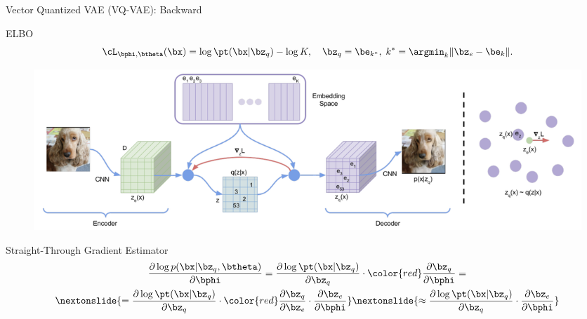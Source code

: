\documentclass{beamer}
\begin{document}
\begin{frame}{Vector Quantized VAE (VQ-VAE): Backward}
	\begin{block}{ELBO}
		\vspace{-0.5cm}
		\[
			\cL_{\bphi, \btheta}(\bx)  =  \log \pt(\bx| \bz_q) - \log K, \quad \bz_q = \be_{k^*},\; k^* = \argmin_k \| \bz_e - \be_k \|.
		\]
		\vspace{-0.5cm}
	\end{block}
    \eqpause
	\begin{figure}
		\centering
		\includegraphics[width=0.85\linewidth]{figs/vqvae}
	\end{figure}
    \eqpause
	\vspace{-0.3cm}
	\begin{block}{Straight-Through Gradient Estimator}
		\vspace{-0.5cm}
		\begin{multline*}
		\frac{\partial \log p(\bx | \bz_q , \btheta)}{\partial \bphi} = \frac{\partial \log \pt(\bx| \bz_q)}{\partial \bz_q} \cdot {\color{red}\frac{\partial \bz_q}{\partial \bphi}} = \\
		\nextonslide{= \frac{\partial \log \pt(\bx| \bz_q)}{\partial \bz_q} \cdot {\color{red}\frac{\partial \bz_q}{\partial \bz_e}} \cdot \frac{\partial \bz_e}{\partial \bphi}}
		\nextonslide{\approx \frac{\partial \log \pt(\bx| \bz_q)}{\partial \bz_q} \cdot \frac{\partial \bz_e}{\partial \bphi}}
		\end{multline*}
	\end{block}
\end{frame}
\end{document}
